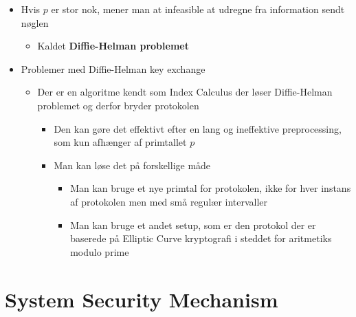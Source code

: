\documentclass[a4, english]{article}
\begin{document}
\begin{itemize}
	\item Hvis $p$ er stor nok, mener man at infeasible at udregne fra information sendt nøglen   
  \begin{itemize}
  	\item Kaldet \textbf{Diffie-Helman problemet}
  \end{itemize}
  \item Problemer med Diffie-Helman key exchange
  \begin{itemize}
  	\item Der er en algoritme kendt som Index Calculus der løser Diffie-Helman problemet og derfor bryder protokolen
    \begin{itemize}
    	\item Den kan gøre det effektivt efter en lang og ineffektive preprocessing, som kun afhænger af primtallet $p$ 
      \item Man kan løse det på forskellige måde
      \begin{itemize}
      	\item Man kan bruge et nye primtal for protokolen, ikke for hver instans af protokolen men med små regulær intervaller  
        \item Man kan bruge et andet setup, som er den protokol der er baserede på Elliptic Curve kryptografi i steddet for aritmetiks modulo prime
      \end{itemize}
    \end{itemize}
  \end{itemize}
\end{itemize}
\newpage

\section{System Security Mechanism}
\end{document}
